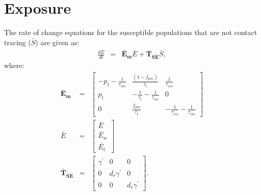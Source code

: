 \documentclass{article}
\begin{document}
\section{Exposure}
The rate of change equations for the susceptible populations that are not contact tracing ($\bar{S}$) are given as:
\begin{eqnarray}
\frac{d\bar{E}}{dt} &=& \boldsymbol{\bar{E}_{m}}  \bar{E} + \boldsymbol{\bar{T}_{\bar{S}\bar{E}}}  \bar{S}, 
\end{eqnarray}
where:
\begin{eqnarray}
\boldsymbol{\bar{E}_{m}} &=&
\begin{bmatrix}
 - p_{t} -\frac{1}{\tau_{inc}}  &  \frac{(1-f_{pos})}{\tau_{t}}             & \frac{1}{\tau_{iso}} \\ 
 p_{t}              & -\frac{1}{\tau_{t}} -\frac{1}{\tau_{inc}}  & 0  \\ 
 0                  & \frac{f_{pos}}{\tau_{t}}                  & -\frac{1}{\tau_{iso}} -\frac{1}{\tau_{inc}}
\end{bmatrix} \\ 
%
\bar{E} &=& 
\begin{bmatrix}
\bar{E} \\ \bar{E}_{w}\\ \bar{E_{t}}
\end{bmatrix} \\
%
\boldsymbol{\bar{T}_{\bar{S}\bar{E}}} &=& 
    \begin{bmatrix}
\gamma^{'}  & 0                 & 0 \\ 
 0          & d_{r} \gamma^{'}  & 0 \\ 
 0          & 0                 & d_{r} \gamma^{'} 
\end{bmatrix}.
%
\end{eqnarray}
\end{document}
